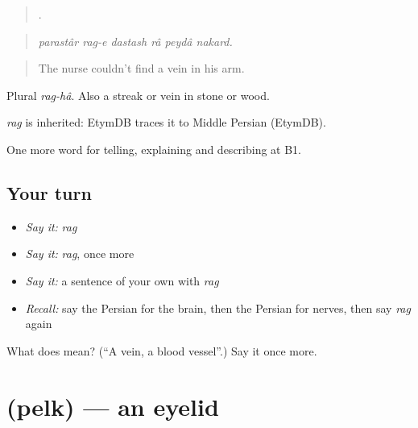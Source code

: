 \begin{quote}
     .
\end{quote}

\begin{quote}
\emph{parastâr rag-e dastash râ peydâ nakard.}
\end{quote}

\begin{quote}
The nurse couldn't find a vein in his arm.
\end{quote}

Plural \emph{rag-hâ}. Also a streak or vein in stone or wood.

\begin{cousinweb}
\emph{rag} is inherited: EtymDB traces it to Middle Persian (EtymDB).
\end{cousinweb}

\begin{grammarlens}[title={What you've built}]
One more word for telling, explaining and describing at B1.
\end{grammarlens}

\subsection*{Your turn}
\begin{itemize}
\raggedright
  \item \emph{Say it:} \emph{rag}
  \item \emph{Say it:} \emph{rag}, once more
  \item \emph{Say it:} a sentence of your own with \emph{rag}
  \item \emph{Recall:} say the Persian for the brain, then the Persian for nerves, then say \emph{rag} again
\end{itemize}

\begin{tcolorbox}[breakable,colback=teal!4,colframe=teal!35!black,title={Before you move on}]
What does  mean? (\textquotedblleft{}A vein, a blood vessel\textquotedblright{}.) Say it once more.
\end{tcolorbox}
\section[\texorpdfstring{\fa{پلک} (pelk)}{پلک (pelk)}]{ (pelk) — an eyelid}

\label{lesson:FA-C496-pelk}



